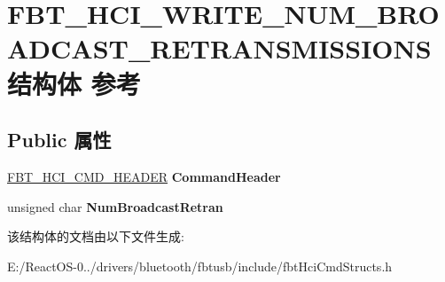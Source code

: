 \hypertarget{struct_f_b_t___h_c_i___w_r_i_t_e___n_u_m___b_r_o_a_d_c_a_s_t___r_e_t_r_a_n_s_m_i_s_s_i_o_n_s}{}\section{F\+B\+T\+\_\+\+H\+C\+I\+\_\+\+W\+R\+I\+T\+E\+\_\+\+N\+U\+M\+\_\+\+B\+R\+O\+A\+D\+C\+A\+S\+T\+\_\+\+R\+E\+T\+R\+A\+N\+S\+M\+I\+S\+S\+I\+O\+N\+S结构体 参考}
\label{struct_f_b_t___h_c_i___w_r_i_t_e___n_u_m___b_r_o_a_d_c_a_s_t___r_e_t_r_a_n_s_m_i_s_s_i_o_n_s}
\subsection*{Public 属性}
\begin{DoxyCompactItemize}
\item 
\mbox{\label{struct_f_b_t___h_c_i___w_r_i_t_e___n_u_m___b_r_o_a_d_c_a_s_t___r_e_t_r_a_n_s_m_i_s_s_i_o_n_s_a6b2246dc1b4571e30726df3a17183839}} 
\hyperlink{struct_f_b_t___h_c_i___c_m_d___h_e_a_d_e_r}{F\+B\+T\+\_\+\+H\+C\+I\+\_\+\+C\+M\+D\+\_\+\+H\+E\+A\+D\+ER} {\bfseries Command\+Header}
\item 
\mbox{\label{struct_f_b_t___h_c_i___w_r_i_t_e___n_u_m___b_r_o_a_d_c_a_s_t___r_e_t_r_a_n_s_m_i_s_s_i_o_n_s_a3be729a84f8d4261eb17ffab6ce1c9e0}} 
unsigned char {\bfseries Num\+Broadcast\+Retran}
\end{DoxyCompactItemize}


该结构体的文档由以下文件生成\+:\begin{DoxyCompactItemize}
\item 
E\+:/\+React\+O\+S-\/0../drivers/bluetooth/fbtusb/include/fbt\+Hci\+Cmd\+Structs.\+h\end{DoxyCompactItemize}
